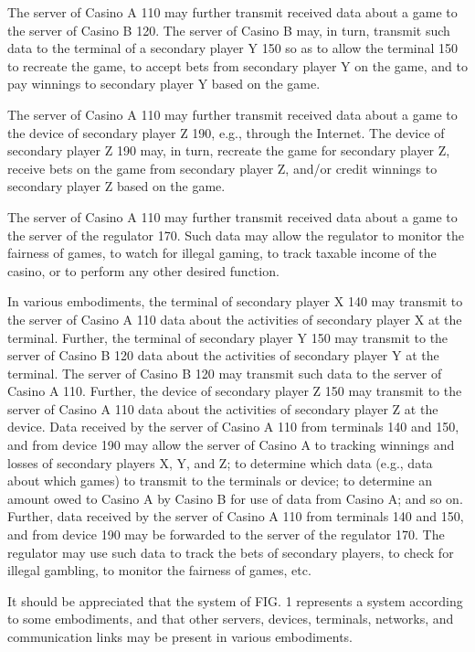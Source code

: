 \documentclass[11pt,a4paper]{article}
\begin{document}
The server of Casino A 110 may further transmit received data about a game to the server of Casino B 120. The server of Casino B may, in turn, transmit such data to the terminal of a secondary player Y 150 so as to allow the terminal 150 to recreate the game, to accept bets from secondary player Y on the game, and to pay winnings to secondary player Y based on the game.

The server of Casino A 110 may further transmit received data about a game to the device of secondary player Z 190, e.g., through the Internet. The device of secondary player Z 190 may, in turn, recreate the game for secondary player Z, receive bets on the game from secondary player Z, and/or credit winnings to secondary player Z based on the game.

The server of Casino A 110 may further transmit received data about a game to the server of the regulator 170. Such data may allow the regulator to monitor the fairness of games, to watch for illegal gaming, to track taxable income of the casino, or to perform any other desired function.

In various embodiments, the terminal of secondary player X 140 may transmit to the server of Casino A 110 data about the activities of secondary player X at the terminal. Further, the terminal of secondary player Y 150 may transmit to the server of Casino B 120 data about the activities of secondary player Y at the terminal. The server of Casino B 120 may transmit such data to the server of Casino A 110. Further, the device of secondary player Z 150 may transmit to the server of Casino A 110 data about the activities of secondary player Z at the device. Data received by the server of Casino A 110 from terminals 140 and 150, and from device 190 may allow the server of Casino A to tracking winnings and losses of secondary players X, Y, and Z; to determine which data (e.g., data about which games) to transmit to the terminals or device; to determine an amount owed to Casino A by Casino B for use of data from Casino A; and so on. Further, data received by the server of Casino A 110 from terminals 140 and 150, and from device 190 may be forwarded to the server of the regulator 170. The regulator may use such data to track the bets of secondary players, to check for illegal gambling, to monitor the fairness of games, etc.

It should be appreciated that the system of FIG. 1 represents a system according to some embodiments, and that other servers, devices, terminals, networks, and communication links may be present in various embodiments.
\end{document}

